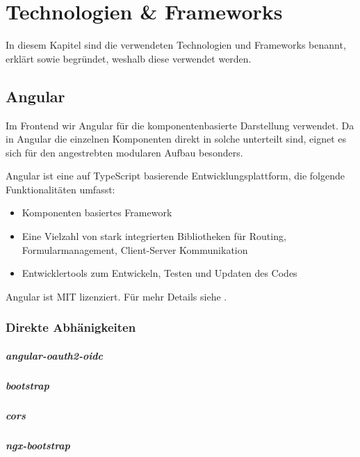 \chapter{Technologien & Frameworks}\label{ch:technologien-&-frameworks}

In diesem Kapitel sind die verwendeten Technologien und Frameworks benannt, erklärt
sowie begründet, weshalb diese verwendet werden.

\section{Angular}\label{sec:angular}

Im Frontend wir Angular für die komponentenbasierte Darstellung verwendet.
Da in Angular die einzelnen Komponenten direkt in solche unterteilt sind,
eignet es sich für den angestrebten modularen Aufbau besonders.

Angular ist eine auf \gls{TypeScript} basierende Entwicklungsplattform, die folgende Funktionalitäten umfasst:
\begin{itemize}
    \item Komponenten basiertes Framework
    \item Eine Vielzahl von stark integrierten Bibliotheken für Routing, Formularmanagement, Client-Server Kommunikation
    \item Entwicklertools zum Entwickeln, Testen und Updaten des Codes
\end{itemize}
\cite{about-angular}

Angular ist MIT lizenziert.
Für mehr Details siehe .

\subsection{Direkte Abhänigkeiten}

\paragraph{angular-oauth2-oidc}

\paragraph{bootstrap}

\paragraph{cors}

\paragraph{ngx-bootstrap}

